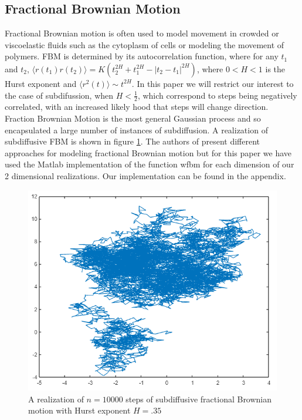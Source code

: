 \documentclass[%
 reprint,
 amsmath,amssymb,
 aps,
]{revtex4-2}
\begin{document}
\subsection{Fractional Brownian Motion}
Fractional Brownian motion is often used to model movement in crowded or viscoelastic fluids such as the cytoplasm of cells or modeling the movement of polymers\cite{ernst_fractional_2012, CHAKRAVARTI19979}. FBM is determined by its autocorrelation function, where for any $t_1$ and $t_2$, $\langle r(t_1)r(t_2)\rangle=K(t_2^{2H}+t_1^{2H}-|t_2-t_1|^{2H})$, where $0< H< 1$ is the Hurst exponent and $\langle r^2(t)\rangle\sim t^{2H}$. In this paper we will restrict our interest to the case of subdifussion, when $H< \frac{1}{2}$, which correspond to steps being negatively correlated, with an increased likely hood that steps will change direction. Fraction Brownian Motion is the most general Gaussian process and so encapsulated a large number of instances of subdiffusion\cite{krapf_spectral_2019}. A realization of subdiffusive FBM is shown in figure \ref{fig:fbm_r}. The authors of \cite{enriquez_simple_2004} present different approaches for modeling fractional Brownian motion but for this paper we have used the Matlab implementation of the function wfbm for each dimension of our 2 dimensional realizations. Our implementation can be found in the appendix.

\begin{figure}
    \centering
    \includegraphics[scale=0.48]{fbm_realization_h35_n10000.png}
    \caption{A realization of $n=10000$ steps of subdiffusive fractional Brownian motion with Hurst exponent $H=.35$}
    \label{fig:fbm_r}
\end{figure}
\end{document}

